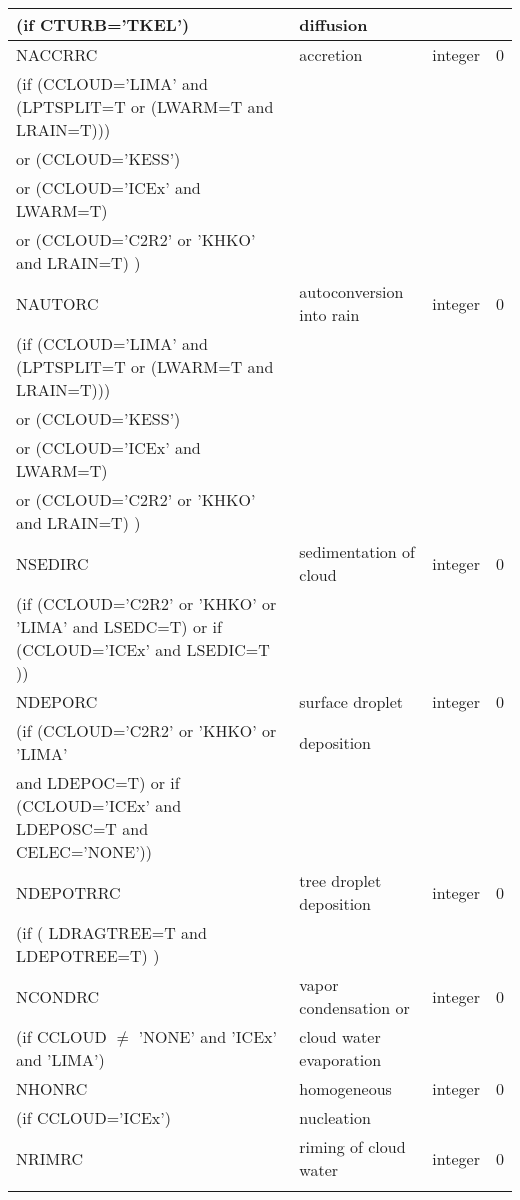 \begin{longtable} {|p{}|p{}|>{\centering}p{}|p{}<{\centering}|}
(if CTURB='TKEL') &diffusion &   &  \\\hline
NACCRRC  & accretion & integer  &  0 \index{NACCRC!\innam{NAM\_BU\_RRC}}\\ \nopagebreak
(if (CCLOUD='LIMA' and (LPTSPLIT=T or (LWARM=T and LRAIN=T))) & & & \\ \nopagebreak
 or (CCLOUD='KESS') & & & \\ \nopagebreak
 or (CCLOUD='ICEx' and LWARM=T) & & & \\ \nopagebreak
 or (CCLOUD='C2R2' or 'KHKO' and LRAIN=T) ) & & & \\ \hline
NAUTORC  & autoconversion into rain & integer  &  0 \index{NAUTORC!\innam{NAM\_BU\_RRC}}\\ \nopagebreak
(if (CCLOUD='LIMA' and (LPTSPLIT=T or (LWARM=T and LRAIN=T))) & & & \\ \nopagebreak
 or (CCLOUD='KESS') & & & \\ \nopagebreak
 or (CCLOUD='ICEx' and LWARM=T) & & & \\ \nopagebreak
 or (CCLOUD='C2R2' or 'KHKO' and LRAIN=T) ) & & & \\ \hline
NSEDIRC  & sedimentation of cloud   & integer  &  0 \index{NSEDIRC!\innam{NAM\_BU\_RRC}}\\ \nopagebreak
(if (CCLOUD='C2R2' or 'KHKO' or 'LIMA' and LSEDC=T) or if (CCLOUD='ICEx' and LSEDIC=T )) &  &   &   \\\hline
NDEPORC  & surface droplet   & integer  &  0 \index{NDEPORC!\innam{NAM\_BU\_RRC}}\\ \nopagebreak
(if (CCLOUD='C2R2' or 'KHKO' or 'LIMA' & deposition &   &  \\ \nopagebreak
 and LDEPOC=T) or if (CCLOUD='ICEx' and LDEPOSC=T and CELEC='NONE')) &  &   &   \\\hline
NDEPOTRRC  & tree droplet deposition   & integer  &  0 \index{NDEPOTRRC!\innam{NAM\_BU\_RRC}}\\ \nopagebreak
(if ( LDRAGTREE=T and LDEPOTREE=T) ) &  &   &   \\\hline
NCONDRC  &vapor condensation or & integer  &  0 \index{NCONDRC!\innam{NAM\_BU\_RRC}}\\ \nopagebreak
(if CCLOUD $\neq$ 'NONE' and 'ICEx' and 'LIMA') &cloud water evaporation &   &  \\\hline
NHONRC   & homogeneous   & integer  &  0 \index{NHONRC!\innam{NAM\_BU\_RRC}}\\ \nopagebreak
(if CCLOUD='ICEx') &nucleation &   &  \\\hline
NRIMRC   & riming of cloud water   & integer  &  0 \index{NRIMRC!\innam{NAM\_BU\_RRC}}\\ \nopagebreak

\end{longtable}
